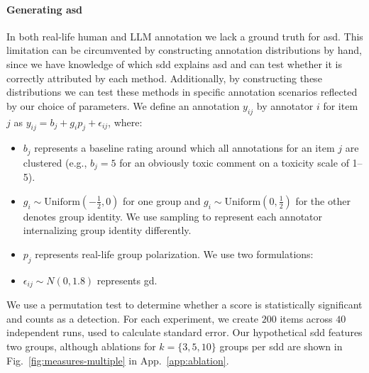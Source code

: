 \documentclass[manuscript,screen,review,anonymous]{acmart}
\theoremstyle{acmplain}
\theoremstyle{researchquestionstyle}
\begin{document}
\paragraph{Generating \ac{asd}} In both real-life human and LLM annotation we lack a ground truth for \ac{asd}. This limitation can be circumvented by constructing annotation distributions by hand, since we have knowledge of which \ac{sdd} explains \ac{asd} and can test whether it is correctly attributed by each method. Additionally, by constructing these distributions we can test these methods in specific annotation scenarios reflected by our choice of parameters. We define an annotation $y_{ij}$ by annotator $i$ for item $j$ as $y_{ij} = b_j + g_i p_j + \epsilon_{ij}$, where:
\begin{itemize}
	\item $b_j$  represents a baseline rating around which all annotations for an item $j$  are clustered  (e.g., $b_j=5$ for an obviously toxic comment on a toxicity scale of 1--5).
	
	\item $g_i \sim \text{Uniform}(-\frac{1}{2}, 0)$ for one group and $g_i \sim \text{Uniform}(0, \frac{1}{2})$ for the other denotes group identity. We use sampling to represent each annotator internalizing group identity differently.
	
	\item $p_j$ represents real-life group polarization. We use two formulations:
	
	\item $\epsilon_{ij} \sim N(0, 1.8)$ represents \ac{gd}. 
\end{itemize}

We use a permutation test to determine whether a score is statistically significant and counts as a detection. For each experiment, we create $200$ items across $40$ independent runs, used to calculate standard error. Our hypothetical \ac{sdd} features two groups, although ablations for $k=\{3,5,10\}$ groups per \ac{sdd} are shown in Fig.~\ref{fig:measures-multiple} in App.~\ref{app:ablation}.
\end{document}
